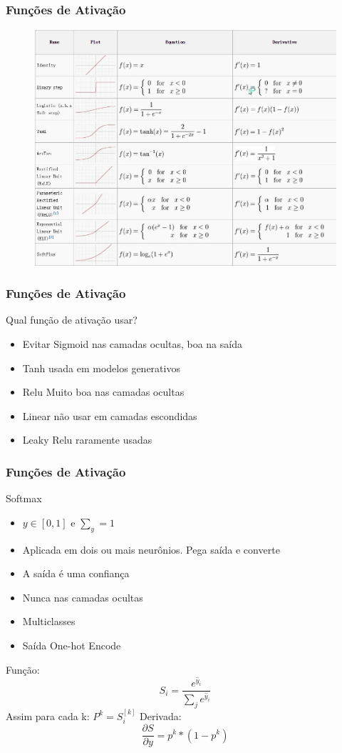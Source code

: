 \documentclass{beamer}
\begin{document}
\begin{frame}
	\frametitle{Funções de Ativação}
	\begin{figure}
		\centering
		\includegraphics[width=0.7\linewidth]{figures/mais_activation_functions}
	\end{figure}

\end{frame}
\begin{frame}
	\frametitle{Funções de Ativação}
	\begin{alertblock}{ Qual função de ativação usar?}
		\begin{itemize}
		\item	Evitar Sigmoid nas camadas ocultas, boa na saída
		\item	Tanh usada em modelos generativos
		\item	Relu Muito boa nas camadas ocultas
		\item	Linear não usar em camadas escondidas
		\item	Leaky Relu  raramente usadas
		\end{itemize}
	\end{alertblock}	
\end{frame}
\begin{frame}
	\frametitle{Funções de Ativação}
	\begin{block}{Softmax}
		\begin{itemize}
			\item $y \in [0, 1]$ e $\sum_y = 1$
			\item Aplicada em dois ou mais neurônios. Pega saída e converte
			\item A saída é uma confiança
			\item Nunca nas camadas ocultas
			\item Multiclasses
			\item Saída One-hot Encode
		\end{itemize}
		Função:
		$$S_i = \frac{e^{\hat{y}_i}}{\sum_j e^{\hat{y}_i}} $$
		Assim para cada k: $P^k = S_i^{[k]}$
		Derivada: 	$$\frac{\partial S}{\partial y} = p^k * (1-p^k)$$
	\end{block}
\end{frame}
\end{document}
